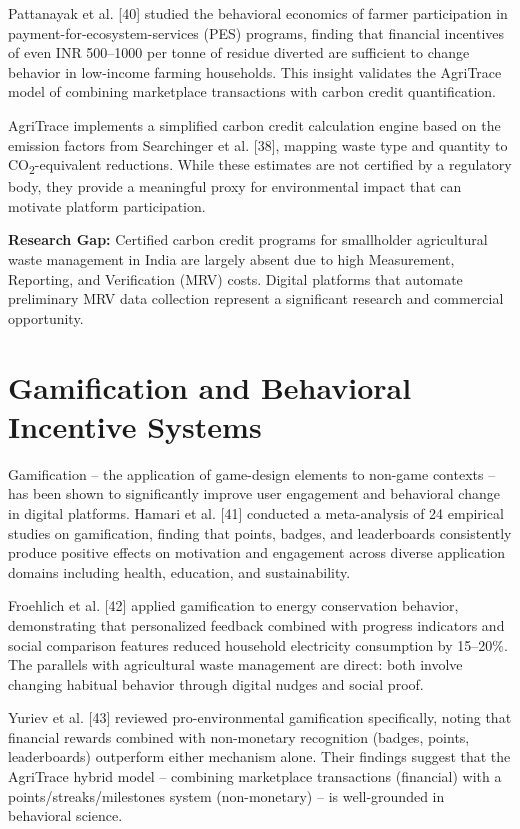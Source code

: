 \documentclass[a4paper,12pt,oneside]{report}
\begin{document}
Pattanayak et al. [40] studied the behavioral economics of farmer participation in payment-for-ecosystem-services (PES) programs, finding that financial incentives of even INR 500--1000 per tonne of residue diverted are sufficient to change behavior in low-income farming households. This insight validates the AgriTrace model of combining marketplace transactions with carbon credit quantification.

AgriTrace implements a simplified carbon credit calculation engine based on the emission factors from Searchinger et al. [38], mapping waste type and quantity to CO\textsubscript{2}-equivalent reductions. While these estimates are not certified by a regulatory body, they provide a meaningful proxy for environmental impact that can motivate platform participation.

\textbf{Research Gap:} Certified carbon credit programs for smallholder agricultural waste management in India are largely absent due to high Measurement, Reporting, and Verification (MRV) costs. Digital platforms that automate preliminary MRV data collection represent a significant research and commercial opportunity.

\section{Gamification and Behavioral Incentive Systems}

\noindent Gamification -- the application of game-design elements to non-game contexts -- has been shown to significantly improve user engagement and behavioral change in digital platforms. Hamari et al. [41] conducted a meta-analysis of 24 empirical studies on gamification, finding that points, badges, and leaderboards consistently produce positive effects on motivation and engagement across diverse application domains including health, education, and sustainability.

Froehlich et al. [42] applied gamification to energy conservation behavior, demonstrating that personalized feedback combined with progress indicators and social comparison features reduced household electricity consumption by 15--20\%. The parallels with agricultural waste management are direct: both involve changing habitual behavior through digital nudges and social proof.

Yuriev et al. [43] reviewed pro-environmental gamification specifically, noting that financial rewards combined with non-monetary recognition (badges, points, leaderboards) outperform either mechanism alone. Their findings suggest that the AgriTrace hybrid model -- combining marketplace transactions (financial) with a points/streaks/milestones system (non-monetary) -- is well-grounded in behavioral science.
\end{document}
